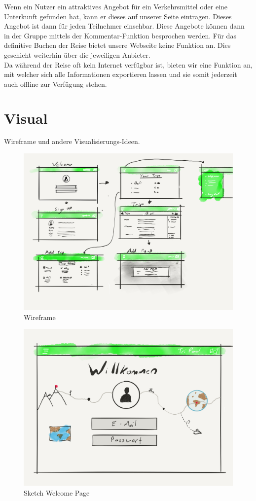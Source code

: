 \documentclass[10pt,a4paper,titlepage,twoside,german,final]{zhawreprt}
\numberwithin{table}{chapter}
\begin{document}
Wenn ein Nutzer ein attraktives Angebot für ein Verkehrsmittel oder eine Unterkunft gefunden hat, kann er dieses auf unserer Seite eintragen. Dieses Angebot ist dann für jeden Teilnehmer einsehbar. Diese Angebote können dann in der Gruppe mittels der Kommentar-Funktion besprochen werden. Für das definitive Buchen der Reise bietet unsere Webseite keine Funktion an. Dies geschieht weiterhin über die jeweiligen Anbieter.\\
Da während der Reise oft kein Internet verfügbar ist, bieten wir eine Funktion an, mit welcher sich alle Informationen exportieren lassen und sie somit jederzeit auch offline zur Verfügung stehen.

\newpage
\section{Visual}\label{sec:Visual}
Wireframe und andere Visualisierungs-Ideen.
\begin{figure}[ht!]
  \includegraphics[width=\linewidth]{images/wireframe.png}
  \caption{Wireframe}
  \label{fig:TripPodLogo2}
\end{figure}
\begin{figure}[ht!]
  \includegraphics[width=\linewidth]{images/wire_Welcome.png}
  \caption{Sketch Welcome Page}
  \label{fig:TripPodLogo3}
\end{figure}
\end{document}
